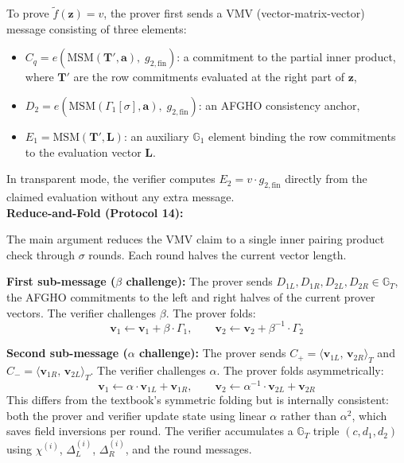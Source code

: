 To prove $\tilde{f}(\mathbf{z}) = v$, the prover first sends a VMV
(vector-matrix-vector) message consisting of three elements:
\begin{itemize}
    \item $C_q = e\!\left(\mathrm{MSM}(\mathbf{T}', \mathbf{a}),\;
          g_{2,\mathrm{fin}}\right)$: a commitment to the partial inner
          product, where $\mathbf{T}'$ are the row commitments evaluated at
          the right part of $\mathbf{z}$,
    \item $D_2 = e\!\left(\mathrm{MSM}(\Gamma_1[\sigma], \mathbf{a}),\;
          g_{2,\mathrm{fin}}\right)$: an AFGHO consistency anchor,
    \item $E_1 = \mathrm{MSM}(\mathbf{T}', \mathbf{L})$: an auxiliary
          $\mathbb{G}_1$ element binding the row commitments to the
          evaluation vector $\mathbf{L}$.
\end{itemize}
In transparent mode, the verifier computes $E_2 = v\cdot g_{2,\mathrm{fin}}$
directly from the claimed evaluation without any extra message.
\\
\textbf{Reduce-and-Fold (Protocol 14):}

The main argument reduces the VMV claim to a single inner pairing product
check through $\sigma$ rounds. Each round halves the current vector length.

\textbf{First sub-message ($\beta$ challenge):} The prover sends
$D_{1L}, D_{1R}, D_{2L}, D_{2R} \in \mathbb{G}_T$, the AFGHO commitments to
the left and right halves of the current prover vectors. The verifier
challenges $\beta$. The prover folds:
\begin{equation}
    \mathbf{v}_1 \leftarrow \mathbf{v}_1 + \beta\cdot\Gamma_1, \qquad
    \mathbf{v}_2 \leftarrow \mathbf{v}_2 + \beta^{-1}\cdot\Gamma_2
\end{equation}

\textbf{Second sub-message ($\alpha$ challenge):} The prover sends
$C_+ = \langle \mathbf{v}_{1L},\, \mathbf{v}_{2R}\rangle_T$ and
$C_- = \langle \mathbf{v}_{1R},\, \mathbf{v}_{2L}\rangle_T$.
The verifier challenges $\alpha$. The prover folds asymmetrically:
\begin{equation}
    \mathbf{v}_1 \leftarrow \alpha\cdot\mathbf{v}_{1L} + \mathbf{v}_{1R},
    \qquad
    \mathbf{v}_2 \leftarrow \alpha^{-1}\cdot\mathbf{v}_{2L} + \mathbf{v}_{2R}
\end{equation}
This differs from the textbook's symmetric folding but is internally
consistent: both the prover and verifier update state using linear $\alpha$
rather than $\alpha^2$, which saves field inversions per round. The verifier
accumulates a $\mathbb{G}_T$ triple $(c, d_1, d_2)$ using $\chi^{(i)}$,
$\Delta_L^{(i)}$, $\Delta_R^{(i)}$, and the round messages.

